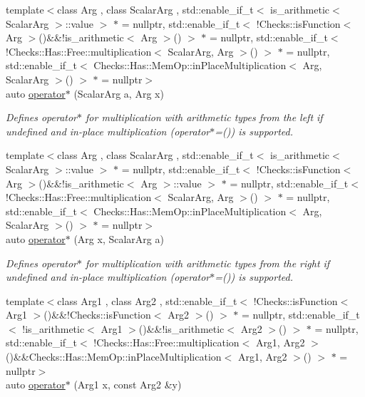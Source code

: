 \begin{DoxyCompactItemize}
{\footnotesize template$<$class Arg , class Scalar\+Arg , std\+::enable\+\_\+if\+\_\+t$<$ is\+\_\+arithmetic$<$ Scalar\+Arg $>$\+::value $>$ $\ast$  = nullptr, std\+::enable\+\_\+if\+\_\+t$<$ !\+Checks\+::is\+Function$<$ Arg $>$()\&\&!is\+\_\+arithmetic$<$ Arg $>$() $>$ $\ast$  = nullptr, std\+::enable\+\_\+if\+\_\+t$<$ !\+Checks\+::\+Has\+::\+Free\+::multiplication$<$ Scalar\+Arg, Arg $>$() $>$ $\ast$  = nullptr, std\+::enable\+\_\+if\+\_\+t$<$ Checks\+::\+Has\+::\+Mem\+Op\+::in\+Place\+Multiplication$<$ Arg, Scalar\+Arg $>$() $>$ $\ast$  = nullptr$>$ }\\auto \hyperlink{namespaceFunG_ac71b238827eda3b6518c39e49447bdeb}{operator$\ast$} (Scalar\+Arg a, Arg x)
\begin{DoxyCompactList}\small\item\em Defines operator$\ast$ for multiplication with arithmetic types from the left if undefined and in-\/place multiplication (operator$\ast$=()) is supported. \end{DoxyCompactList}\item 
{\footnotesize template$<$class Arg , class Scalar\+Arg , std\+::enable\+\_\+if\+\_\+t$<$ is\+\_\+arithmetic$<$ Scalar\+Arg $>$\+::value $>$ $\ast$  = nullptr, std\+::enable\+\_\+if\+\_\+t$<$ !\+Checks\+::is\+Function$<$ Arg $>$()\&\&!is\+\_\+arithmetic$<$ Arg $>$\+::value $>$ $\ast$  = nullptr, std\+::enable\+\_\+if\+\_\+t$<$ !\+Checks\+::\+Has\+::\+Free\+::multiplication$<$ Scalar\+Arg, Arg $>$() $>$ $\ast$  = nullptr, std\+::enable\+\_\+if\+\_\+t$<$ Checks\+::\+Has\+::\+Mem\+Op\+::in\+Place\+Multiplication$<$ Arg, Scalar\+Arg $>$() $>$ $\ast$  = nullptr$>$ }\\auto \hyperlink{namespaceFunG_a49623beb215912a02388a11cc18f15fe}{operator$\ast$} (Arg x, Scalar\+Arg a)
\begin{DoxyCompactList}\small\item\em Defines operator$\ast$ for multiplication with arithmetic types from the right if undefined and in-\/place multiplication (operator$\ast$=()) is supported. \end{DoxyCompactList}\item 
{\footnotesize template$<$class Arg1 , class Arg2 , std\+::enable\+\_\+if\+\_\+t$<$ !\+Checks\+::is\+Function$<$ Arg1 $>$()\&\&!\+Checks\+::is\+Function$<$ Arg2 $>$() $>$ $\ast$  = nullptr, std\+::enable\+\_\+if\+\_\+t$<$ !is\+\_\+arithmetic$<$ Arg1 $>$()\&\&!is\+\_\+arithmetic$<$ Arg2 $>$() $>$ $\ast$  = nullptr, std\+::enable\+\_\+if\+\_\+t$<$ !\+Checks\+::\+Has\+::\+Free\+::multiplication$<$ Arg1, Arg2 $>$()\&\&\+Checks\+::\+Has\+::\+Mem\+Op\+::in\+Place\+Multiplication$<$ Arg1, Arg2 $>$() $>$ $\ast$  = nullptr$>$ }\\auto \hyperlink{namespaceFunG_ad023f2d2273af693f2b4ebceeb296dc8}{operator$\ast$} (Arg1 x, const Arg2 \&y)

\end{DoxyCompactItemize}
